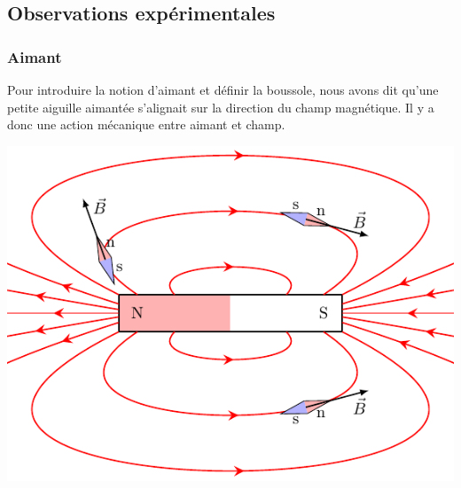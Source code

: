 \documentclass[../../main/main.tex]{subfiles}
\begin{document}
\subsection{Observations expérimentales}
\label{ssec:obsexp}
\subsubsection{Aimant}
\label{sssec:label}
\vspace{-20pt}
\noindent
\begin{minipage}[c]{.65\linewidth}
	Pour introduire la notion d'aimant et définir la boussole, nous avons dit qu'une
	petite aiguille aimantée s'alignait sur la direction du champ magnétique. Il y a
	donc une action mécanique entre aimant et champ.
\end{minipage}
\hfill
\begin{minipage}[c]{.30\linewidth}
	\begin{center}
		\includegraphics[width=\linewidth]{aim_ac}
		\label{fig:aim_ac}
	\end{center}
\end{minipage}
\end{document}
